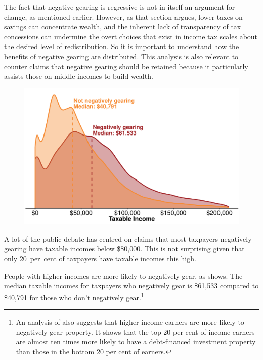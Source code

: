 The fact that negative gearing is regressive is not in itself an argument for change, as mentioned earlier\DEVIATION{}. 
However, as that section argues, lower taxes on savings can concentrate wealth, and the inherent lack of transparency of tax concessions can undermine the overt choices that exist in income tax scales about the desired level of redistribution. 
So it is important to understand how the benefits of negative gearing are distributed. 
This analysis is also relevant to counter claims that negative gearing should be retained because it particularly assists those on middle incomes to build wealth. 

\begin{figure}

\includegraphics[width=\columnwidth]{CGT-NG-atlas//tx-inc-distr-by-NG-1}
\end{figure}

A lot of the public debate has centred on claims that most taxpayers negatively gearing have taxable incomes below \$80,000. This is not surprising given that only 20~per~cent of taxpayers have taxable incomes this high. 

People with higher incomes are more likely to negatively gear, as  shows. The median taxable incomes for taxpayers who negatively gear is \$61,533 compared to \$40,791 for those who don’t negatively gear.\footnote{An \textcite{RBA2015SubmissionHomeOwnershipInquiry} analysis of \textcite{HILDA2015} also suggests that higher income earners are more likely to negatively gear property. It shows that the top 20 per cent of income earners are almost ten times more likely to have a debt-financed investment property than those in the bottom 20 per cent of earners.}

